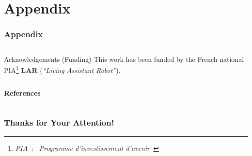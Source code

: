 \documentclass[10pt,c]{beamer}
\begin{document}

\appendix


\section{Appendix}

\begin{frame}[allowframebreaks]
\frametitle{Appendix}
\begin{columns}[c]
\begin{column}{8.25cm}
\begin{block}{Acknowledgements (Funding)}
This work has been funded by the French national PIA\footnote{\textsl{PIA~:
\guillemotleft~Programme d'investissement d'avenir~\guillemotright}}
\textbf{LAR} (\textit{``Living Assistant Robot''}).
\end{block}
\end{column}
\end{columns}

\vspace{0.75cm}

\textbf{References}
\vspace{0.25cm}
\tiny


\end{frame}


\section{}

\begin{frame}
\frametitle{Thanks for Your Attention!}
\begin{block}{}
\end{block}
\end{frame}


\end{document}
